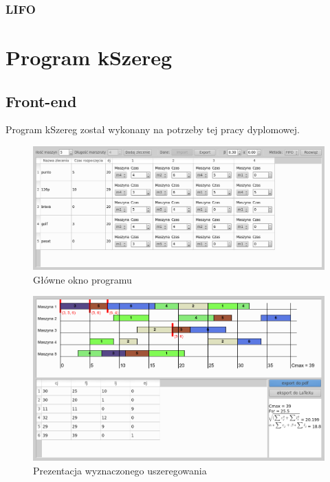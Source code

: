 \documentclass[twoside]{pracaInzynierskaMS}
\begin{document}
\subsubsection  {LIFO}

       
\section        {Program kSzereg}
\subsection     {Front-end}
Program kSzereg został wykonany na potrzeby tej pracy dyplomowej.\\

\begin{figure}[htb]
    \centering
    \includegraphics[width=\textwidth, keepaspectratio=true]{./main}
    \caption{Główne okno programu}
\end{figure}

\begin{figure}[htb]
    \centering
    \includegraphics[width=\textwidth, keepaspectratio=true]{./wykres}
    \caption{Prezentacja wyznaczonego uszeregowania}
\end{figure}
\end{document}
